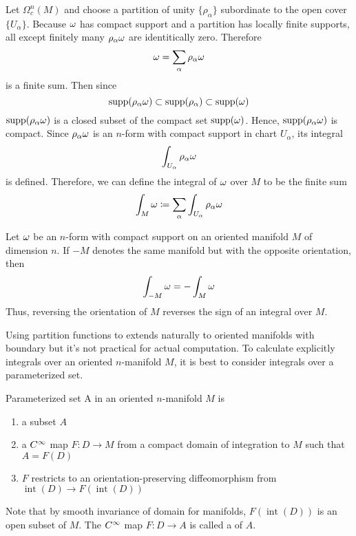 Let \(\Omega_c^n (M)\) and choose a partition of unity \(\{ \rho_\alpha \}\) subordinate to the open cover \(\{ U_\alpha \}\).
Because \(\omega\) has compact support and a partition has locally finite supports, all except finitely many \(\rho_\alpha \omega\) are identitically zero.
Therefore
\[
    \omega = \sum_\alpha \rho_\alpha \omega    
\]
is a finite sum.
Then since 
\[
    \operatorname{supp}(\rho_\alpha \omega) \subset \operatorname{supp}(\rho_\alpha) \subset \operatorname{supp}(\omega)
\]
\(\operatorname{supp}(\rho_\alpha \omega)\) is a closed subset of the compact set \(\operatorname{supp}(\omega)\).
Hence, \(\operatorname{supp}(\rho_\alpha \omega)\) is compact.
Since \(\rho_\alpha \omega\) is an \(n\)-form with compact support in chart \(U_\alpha\), its integral
\[
    \int_{U_\alpha} \rho_\alpha \omega   
\]
is defined.
Therefore, we can define the integral of \(\omega\) over \(M\) to be the finite sum 
\[
    \int_M \omega \coloneqq \sum_\alpha \int_{U_\alpha} \rho_\alpha \omega
\]
\begin{proposition}{}{}
    Let \(\omega\) be an \(n\)-form with compact support on an oriented manifold \(M\) of dimension \(n\).
    If \(-M\) denotes the same manifold but with the opposite orientation, then 
    \[
        \int_{-M} \omega = - \int_M \omega
    \]
    Thus, reversing the orientation of \(M\) reverses the sign of an integral over \(M\).
\end{proposition}
Using partition functions to extends naturally to oriented manifolds with boundary but it's not practical for actual computation.
To calculate explicitly integrals over an oriented \(n\)-manifold \(M\), it is best to consider integrals over a parameterized set.
\begin{definition}{Parameterized set}{}
    A  in an oriented \(n\)-manifold \(M\) is
    \begin{enumerate}
        \item a subset \(A\)
        \item a \(C^\infty\) map \(F \colon D \rightarrow M\) from a compact domain of integration to \(M\) such that \(A = F(D)\)
        \item \(F\) restricts to an orientation-preserving diffeomorphism from \(\operatorname{int}(D) \rightarrow F(\operatorname{int}(D))\)
    \end{enumerate}
    Note that by smooth invariance of domain for manifolds, \(F(\operatorname{int}(D))\) is an open subset of \(M\).
    The \(C^\infty\) map \(F \colon D \rightarrow A\) is called a  of \(A\).
\end{definition}

